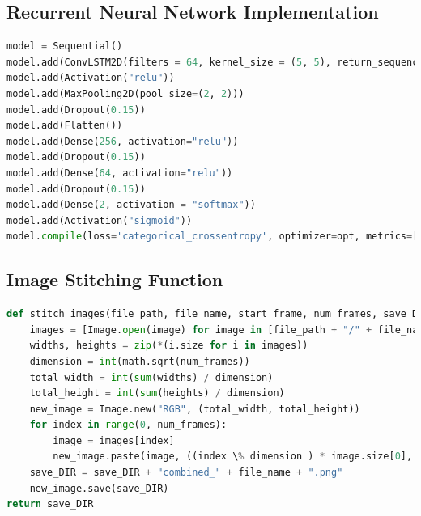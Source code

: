 \documentclass[12pt]{article}
\numberwithin{figure}{section} %
\begin{document}
\subsection{Recurrent Neural Network Implementation}
\label{subsection:Recurrent Neural Network Implementation}
\begin{lstlisting}[language = Python]
model = Sequential()
model.add(ConvLSTM2D(filters = 64, kernel_size = (5, 5), return_sequences = False, data_format = "channels_last", input_shape = X.shape[1:]))
model.add(Activation("relu"))
model.add(MaxPooling2D(pool_size=(2, 2)))
model.add(Dropout(0.15))
model.add(Flatten())
model.add(Dense(256, activation="relu"))
model.add(Dropout(0.15))
model.add(Dense(64, activation="relu"))
model.add(Dropout(0.15))
model.add(Dense(2, activation = "softmax"))
model.add(Activation("sigmoid"))
model.compile(loss='categorical_crossentropy', optimizer=opt, metrics=["accuracy"])
\end{lstlisting}

\subsection{Image Stitching Function}
\label{subsection:Image Stitching Function}
\begin{lstlisting}[language = Python]
def stitch_images(file_path, file_name, start_frame, num_frames, save_DIR):
    images = [Image.open(image) for image in [file_path + "/" + file_name + str(x) + ".png" for x in range(start_frame, start_frame + num_frames)]]
    widths, heights = zip(*(i.size for i in images))
    dimension = int(math.sqrt(num_frames))
    total_width = int(sum(widths) / dimension)
    total_height = int(sum(heights) / dimension)
    new_image = Image.new("RGB", (total_width, total_height))
    for index in range(0, num_frames):
        image = images[index]
        new_image.paste(image, ((index \% dimension ) * image.size[0], math.floor(index / dimension) * image.size[1]))
    save_DIR = save_DIR + "combined_" + file_name + ".png"
    new_image.save(save_DIR)
return save_DIR
\end{lstlisting}
\end{document}

